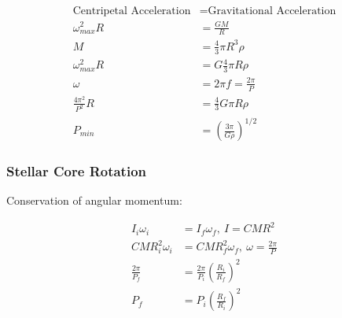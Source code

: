 \documentclass[a4paper,11pt,normalem]{article}
\begin{document}
\[
    \begin{aligned}
    \text{Centripetal Acceleration} &= \text{Gravitational Acceleration} \\
    \omega^2_{max}R &= \frac{GM}{R} \\
    M &= \frac{4}{3}\pi R^3\rho \\
    \omega_{max}^2 R &= G \frac{4}{3}\pi R \rho \\
    \omega &= 2\pi f = \frac{2\pi}{P} \\
    \frac{4\pi^2}{P^2}R &= \frac{4}{3}G\pi R\rho \\
    P_{min} &= \left(\frac{3\pi}{G\rho}\right)^{1/2}
    \end{aligned}
\]

\subsubsection{Stellar Core Rotation}\label{stellar-core-rotation}

Conservation of angular momentum:

\[
    \begin{aligned}
    I_i\omega_i &= I_f\omega_f, ~ I = CMR^2 \\
    CMR_i^2\omega_i &= CMR_f^2\omega_f, ~ \omega = \frac{2\pi}{P} \\
    \frac{2\pi}{P_f} &= \frac{2\pi}{P_i}\left(\frac{R_i}{R_f}\right)^2 \\
    P_f &= P_i\left(\frac{R_f}{R_i}\right)^2
    \end{aligned}
\]
\end{document}
